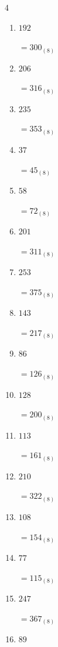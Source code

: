\begin{multicols}{4}
\begin{enumerate}
        $=134_{(8)}$

\columnbreak %

  \item $192$

        $=300_{(8)}$

  \item $206$

        $=316_{(8)}$

  \item $235$

        $=353_{(8)}$

  \item $37$

        $=45_{(8)}$

  \item $58$

        $=72_{(8)}$

  \item $201$

        $=311_{(8)}$

  \item $253$

        $=375_{(8)}$

  \item $143$

        $=217_{(8)}$

  \item $86$

        $=126_{(8)}$

  \item $128$

        $=200_{(8)}$

  \item $113$

        $=161_{(8)}$

  \item $210$

        $=322_{(8)}$

  \item $108$

        $=154_{(8)}$

  \item $77$

        $=115_{(8)}$

  \item $247$

        $=367_{(8)}$

\columnbreak %

  \item $89$


\end{enumerate}
\end{multicols}
